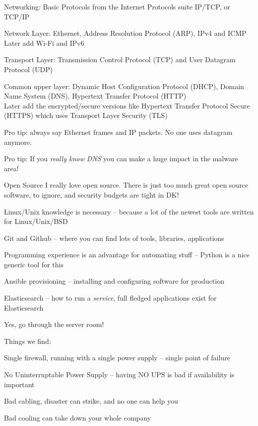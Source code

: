\documentclass[Screen16to9,17pt]{foils}
\begin{document}
Networking: Basic Protocols from the Internet Protocols suite IP/TCP, or TCP/IP
\begin{list2}
\item Network Layer: Ethernet, Address Resolution Protocol (ARP), IPv4 and ICMP\\
Later add Wi-Fi and IPv6
\item Transport Layer: Transmission Control Protocol (TCP) and User Datagram Protocol (UDP)
\item Common upper layer: Dynamic Host Configuration Protocol (DHCP), Domain Name System (DNS),
Hypertext Transfer Protocol (HTTP)\\
Later add the encrypted/secure versions like Hypertext Transfer Protocol Secure (HTTPS) which uses Transport Layer Security (TLS)
\end{list2}

Pro tip: always say Ethernet frames and IP packets. No one uses datagram anymore.

Pro tip: If you \emph{really know DNS} you can make a huge impact in the malware area!



\begin{list2}
\item Open Source I really love open source. There is just too much great open source software, to ignore, and security budgets are tight in DK!
\item Linux/Unix knowledge is necessary
-- because a lot of the newest tools are written for Linux/Unix/BSD
\item Git and Github -- where you can find lots of tools, libraries, applications
\item Programming experience is an advantage for automating stuff -- Python is a nice generic tool for this
\item Ansible provisioning -- installing and configuring software for production
\item Elasticsearch -- how to run a \emph{service}, full fledged applications exist for Elasticsearch
\end{list2}





Yes, go through the server room!

Things we find:
\begin{list2}
\item Single firewall, running with a single power supply -- single point of failure
\item No Uninterruptable Power Supply -- having NO UPS is bad if availability is important
\item Bad cabling, disaster can strike, and no one can help you
\item Bad cooling can take down your whole company
\end{list2}
\end{document}

